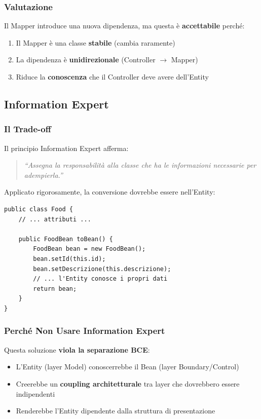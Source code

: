 \documentclass[12pt,a4paper]{article}
\begin{document}
\subsubsection{Valutazione}

Il Mapper introduce una nuova dipendenza, ma questa è \textbf{accettabile} perché:
\begin{enumerate}
    \item Il Mapper è una classe \textbf{stabile} (cambia raramente)
    \item La dipendenza è \textbf{unidirezionale} (Controller $\rightarrow$ Mapper)
    \item Riduce la \textbf{conoscenza} che il Controller deve avere dell'Entity
\end{enumerate}

\subsection{Information Expert}

\subsubsection{Il Trade-off}

Il principio Information Expert afferma:
\begin{quote}
\textit{``Assegna la responsabilità alla classe che ha le informazioni necessarie per adempierla.''}
\end{quote}

Applicato rigorosamente, la conversione dovrebbe essere nell'Entity:

\begin{lstlisting}[style=javastyle, caption={Alternativa: Conversione nell'Entity}]
public class Food {
    // ... attributi ...
    
    public FoodBean toBean() {
        FoodBean bean = new FoodBean();
        bean.setId(this.id);
        bean.setDescrizione(this.descrizione);
        // ... l'Entity conosce i propri dati
        return bean;
    }
}
\end{lstlisting}

\subsubsection{Perché Non Usare Information Expert}

Questa soluzione \textbf{viola la separazione BCE}:
\begin{itemize}
    \item L'Entity (layer Model) conoscerrebbe il Bean (layer Boundary/Control)
    \item Creerebbe un \textbf{coupling architetturale} tra layer che dovrebbero essere indipendenti
    \item Renderebbe l'Entity dipendente dalla struttura di presentazione
\end{itemize}
\end{document}
